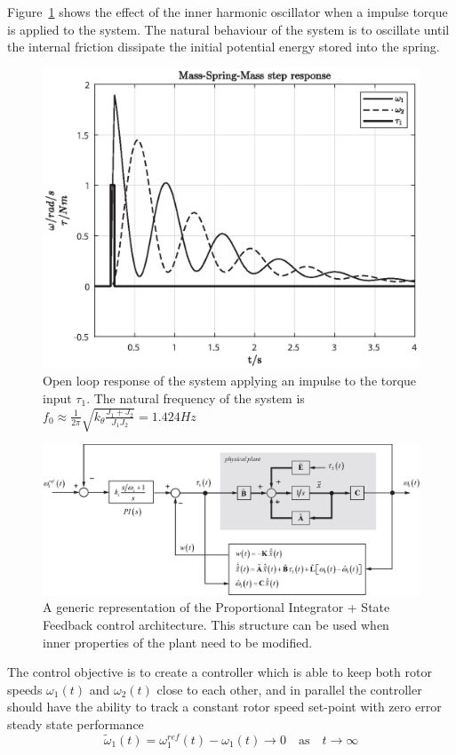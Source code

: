 \documentclass[11pt,a4paper,oneside]{book}
\numberwithin{equation}{section}
\theoremstyle{it}
\theoremstyle{definition}
\begin{document}
Figure~\ref{fig_stepresp} shows the effect of the inner harmonic oscillator when a impulse torque is applied to the system. The natural behaviour of the system is to oscillate until the internal friction dissipate the initial potential energy stored into the spring. 
\begin{figure}[H]
	\centering
	\includegraphics[width = 320pt, 
	keepaspectratio]{figures/msm/step_resp.eps}
	\captionsetup{width=0.65\textwidth, font=small}	
	\caption{Open loop response of the system applying an impulse to the torque 
		input $\tau_1$. The natural frequency of the system is $f_0 \approx 
		\frac{1}{2\pi}\sqrt{k_{\theta}\frac{J_1+J_2}{J_1J_2}} = 1.424 Hz$}
	\label{fig_stepresp}
\end{figure}
\begin{figure}[H]
	\centering
	\includegraphics[width = 460pt, angle = 0, 
	keepaspectratio]{figures/msm/servo_msm_4.eps}
	\captionsetup{width=0.65\textwidth, font=small}
	\caption{A generic representation of the Proportional Integrator + State 
		Feedback control architecture. This structure can be used when inner 
		properties of the plant need to be modified.}
	\label{general_integral_ctrl}
\end{figure}
The control objective is to create a controller which is able to keep both rotor speeds $\omega_1(t)$ and $\omega_2(t)$ close to each other, and in parallel the controller should have the ability to track a constant rotor speed set-point with zero error steady state performance $$\tilde{\omega}_1(t) = \omega_1^{ref}(t)-\omega_1(t) \rightarrow0\quad \text{as}\quad t\rightarrow\infty$$
\end{document}
